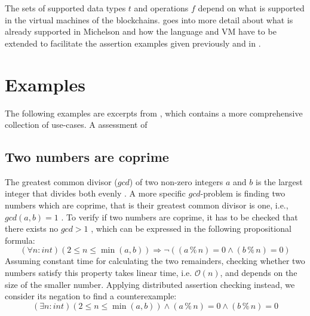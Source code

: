 The sets of supported data types $t$ and operations $f$ depend on what is supported in the virtual machines of the blockchains.  goes into more detail about what is already supported in Michelson and how the language and VM have to be extended to facilitate the assertion examples given previously and in .

\section{Examples}\label{sec:examples}
The following examples are excerpts from \cite{bernhardt_veigel_2020}, which contains a more comprehensive collection of use-cases. A assessment of 

\subsection{Two numbers are coprime}\label{subsec:coprime}
The greatest common divisor ($gcd$) of two non-zero integers $a$ and $b$ is the largest integer that divides both evenly \cite{hardy2008introduction}. A more specific $gcd$-problem is finding two numbers which are coprime, that is their greatest common divisor is one, i.e., $gcd(a, b) = 1$ \cite{hardy2008introduction}. To verify if two numbers are coprime, it has to be checked that there exists no $gcd > 1$ , which can be expressed in the following propositional formula:
\begin{equation}\label{eq:coprime-universial}
    (\forall n : int) (2 \le n \le \min(a,b)) \Rightarrow \neg((a \mathbin{\%} n) = 0 \land (b \mathbin{\%} n) = 0)
\end{equation}
Assuming constant time for calculating the two remainders, checking whether two numbers satisfy this property takes linear time, i.e. $\mathcal{O}(n)$, and depends on the size of the smaller number. Applying distributed assertion checking instead, we consider its negation to find a counterexample:
\begin{equation}\label{eq:coprime-existential}
    (\exists n : int) (2 \le n \le \min(a,b)) \land (a \mathbin{\%} n) = 0 \land (b \mathbin{\%} n) = 0
\end{equation}

